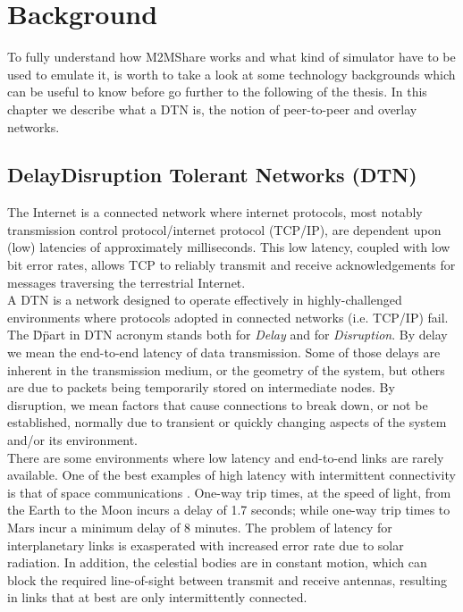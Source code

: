 
\chapter{Background}\label{background} %





To fully understand how M2MShare works and what kind of simulator have to be used to emulate it, is worth to take a look at some technology backgrounds which can be useful to know before go further to the following of the thesis. In this chapter we describe what a DTN is, the notion of peer-to-peer and overlay networks.

\section{Delay\/Disruption Tolerant Networks (DTN)}
The Internet is a connected network where internet protocols, most notably transmission control protocol/internet protocol (TCP/IP), are dependent upon (low) latencies of approximately milliseconds. This low latency, coupled with low bit error rates, allows TCP to reliably transmit and receive acknowledgements for messages traversing the terrestrial Internet. 
\\

A DTN is a network designed to operate effectively in highly-challenged environments where protocols adopted in connected networks (i.e. TCP/IP) fail. The \"D\" part in DTN acronym stands both for \textit{Delay} and for \textit{Disruption}. By delay we mean the end-to-end latency of data transmission. Some of those delays are inherent in the transmission medium, or the geometry of the system, but others are due to packets being temporarily stored on intermediate nodes. By disruption, we mean factors that cause connections to break down, or not be established, normally due to transient or quickly changing aspects of the system and/or its environment.
\\

There are some environments where low latency and end-to-end links are rarely available. One of the best examples of high latency with intermittent connectivity is that of space communications \cite{Burleigh2003365}. One-way trip times, at the speed of light, from the Earth to the Moon incurs a delay of 1.7 seconds; while one-way trip times to Mars incur a minimum delay of 8 minutes. The problem of latency for interplanetary links is exasperated with increased error rate due to solar radiation. In addition, the celestial bodies are in constant motion, which can block the required line-of-sight between transmit and receive antennas, resulting in links that at best are only intermittently connected. 
\\

